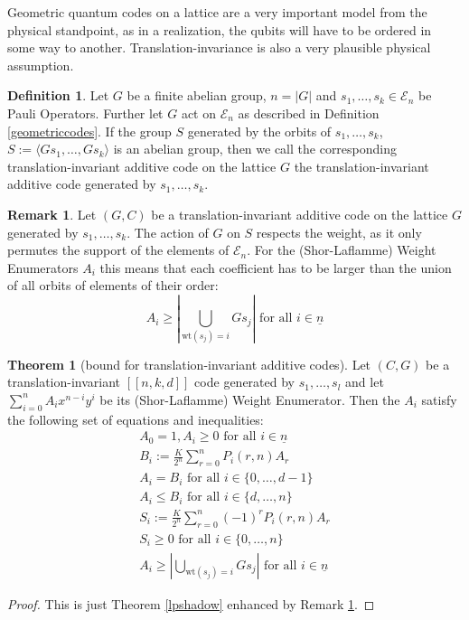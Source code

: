 \documentclass[12pt,a4paper,BCOR15mm,twoside,DIV12]{article}
\def\E{\mathcal{E}}
\def\n{\underline{n}}
\def\fa{\text{ for all }}
\def\wt{\text{wt}}
\theoremstyle{definition}
\newtheorem{theorem}[Satz]{Theorem}
\newtheorem{rem}[Satz]{Remark}
\newtheorem{defn}[Satz]{Definition}
\begin{document}
Geometric quantum codes on a lattice are a very important model from the physical standpoint, as in a realization, the qubits will have to be ordered in some way to another. Translation-invariance is also a very plausible physical assumption.

\begin{defn}
Let $G$ be a finite abelian group, $n = |G|$ and $s_1, \ldots, s_k \in \E_n$ be Pauli Operators. Further let $G$ act on $\E_n$ as described in Definition \ref{geometriccodes}. If the group $S$ generated by the orbits of $s_1, \ldots, s_k$, $S:= \langle Gs_1, \ldots, Gs_k \rangle$ is an abelian group, 
then we call the corresponding translation-invariant additive code on the lattice $G$ the translation-invariant additive code generated by $s_1, \ldots, s_k$.
\end{defn}


\begin{rem}\label{orbitdivides}
Let $(G,C)$ be a translation-invariant additive code on the lattice $G$ generated by $s_1, \ldots, s_k$.
The action of $G$ on $S$ respects the weight, as it only permutes the support of the elements of $\E_n$. 
For the (Shor-Laflamme) Weight Enumerators $A_i$ this means that each coefficient has to be larger than the union of all orbits of elements of their order: \[ A_i \geq | \bigcup_{ \wt(s_j) =i} Gs_j| \fa i \in \n \]
\end{rem}

\begin{theorem}[bound for translation-invariant additive codes]\label{lptranslationinv}
Let $(C,G)$ be a translation-invariant  $[[n,k,d]]$ code generated by $s_1, \ldots, s_l$ and let \\ $\sum_{i=0}^n A_i x^{n-i} y^{i}$ be its (Shor-Laflamme) Weight Enumerator. Then the $A_i$ satisfy the following set of equations and inequalities:
\begin{align}
A_0 = 1, A_i \geq 0 \fa i \in \n \\
B_i := \frac{K}{2^{n}} \sum_{r=0}^n P_i(r,n) A_r \\
A_i = B_i \fa i \in \{0, \ldots, d-1 \} \\
A_i \leq B_i \fa i \in \{d, \ldots, n \} \\
S_i := \frac{K}{2^{n}} \sum_{r=0}^n (-1)^r P_i(r,n) A_r \\
S_i \geq 0 \fa i \in \{0, \ldots, n \} \\
 A_i \geq | \bigcup_{ \wt(s_j) =i} Gs_j| \fa i \in \n 
\end{align}
\begin{proof}
This is just Theorem \ref{lpshadow} enhanced by Remark \ref{orbitdivides}. 
\end{proof}
\end{theorem}
\end{document}
